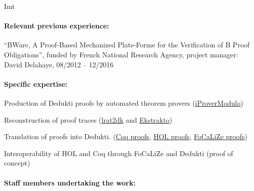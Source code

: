 \begin{sitedescription}{Imt}
\paragraph*{Relevant previous experience:}

\begin{compactitem}
\item ``BWare, A Proof-Based Mechanized Plate-Forme for the Verification of B Proof Obligations'',
funded by French National Research Agency, project manager: David
Delahaye, 08/2012 -- 12/2016
\end{compactitem}



\paragraph*{Specific expertise:}


\begin{compactitem}
\item Production of Dedukti proofs by automated theorem provers (\href{http://www.ensiie.fr/~guillaume.burel/blackandwhite_iProverModulo.html.en}{iProverModulo})
\item Reconstruction of proof traces
  (\href{https://github.com/gburel/lrat2dk}{lrat2dk} and \href{https://github.com/Deducteam/ekstrakto}{Ekstrakto})
\item Translation of proofs into Dedukti. (\href{http://www.ensiie.fr/~guillaume.burel/blackandwhite_coqInE.html.en}{Coq
  proofs}, \href{http://deducteam.gforge.inria.fr/holide/}{HOL
  proofs}, \href{http://deducteam.gforge.inria.fr/focalide/}{FoCaLiZe proofs})
  \item Interoperability of HOL and Coq through FoCaLiZe and Dedukti (proof of concept)
\end{compactitem}

\paragraph*{Staff members undertaking the work:}

\begin{compactitem} %


\end{compactitem}
\end{sitedescription}
